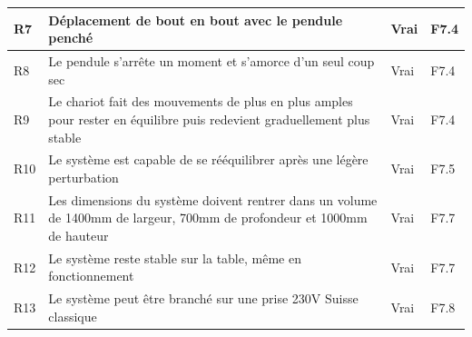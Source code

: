 \begin{table}[H]
{\begin{tabular}{|l|l|l|l|}
            R7                                                                                                                      & Déplacement de bout en bout avec le pendule penché                      & Vrai             & F7.4     \\ \hline
            R8                                                                                                                      & Le pendule s'arrête un moment et s'amorce d'un seul coup sec            & Vrai             & F7.4     \\ \hline
            R9                                                                                                                      &
            Le chariot fait des mouvements de plus en plus amples pour rester en équilibre puis redevient graduellement plus stable &
            Vrai                                                                                                                    &
            F7.4                                                                                                                                                                                                                            \\ \hline
            R10                                                                                                                     & Le système est capable de se rééquilibrer après une légère perturbation & Vrai             & F7.5     \\ \hline
            R11                                                                                                                     &
            Les dimensions du système doivent rentrer dans un volume de 1400mm de largeur, 700mm de profondeur et 1000mm de hauteur &
            Vrai                                                                                                                    &
            F7.7                                                                                                                                                                                                                            \\ \hline
            R12                                                                                                                     & Le système reste stable sur la table, même en fonctionnement            & Vrai             & F7.7     \\ \hline
            R13                                                                                                                     & Le système peut être branché sur une prise 230V Suisse classique        & Vrai             & F7.8     \\ \hline

\end{tabular}}
\end{table}

